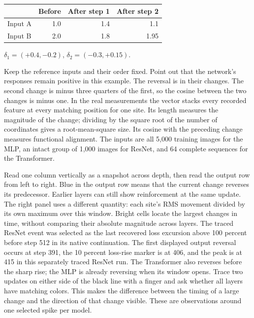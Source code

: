 {
\begin{center}\renewcommand{\arraystretch}{1.2}
\begin{tabular}{@{}lrrr@{}}\toprule
 & Before & After step 1 & After step 2\\\midrule
Input A & 1.0 & 1.4 & 1.1\\
Input B & 2.0 & 1.8 & 1.95\\\bottomrule
\end{tabular}\end{center}
\(\delta_1=(+0.4,-0.2)\), \quad \(\delta_2=(-0.3,+0.15)\).
\par{}}
{Keep the reference inputs and their order fixed. Point out that the network's responses remain positive in this example. The reversal is in their changes. The second change is minus three quarters of the first, so the cosine between the two changes is minus one. In the real measurements the vector stacks every recorded feature at every matching position for one site. Its length measures the magnitude of the change; dividing by the square root of the number of coordinates gives a root-mean-square size. Its cosine with the preceding change measures functional alignment. The inputs are all 5,000 training images for the MLP, an intact group of 1,000 images for ResNet, and 64 complete sequences for the Transformer.}

{
}
{Read one column vertically as a snapshot across depth, then read the output row from left to right. Blue in the output row means that the current change reverses its predecessor. Earlier layers can still show reinforcement at the same update. The right panel uses a different quantity: each site's RMS movement divided by its own maximum over this window. Bright cells locate the largest changes in time, without comparing their absolute magnitude across layers. The traced ResNet event was selected as the last recovered loss excursion above 100 percent before step 512 in its native continuation. The first displayed output reversal occurs at step 391, the 10 percent loss-rise marker is at 406, and the peak is at 415 in this separately traced ResNet run. The Transformer also reverses before the sharp rise; the MLP is already reversing when its window opens. Trace two updates on either side of the black line with a finger and ask whether all layers have matching colors. This makes the difference between the timing of a large change and the direction of that change visible. These are observations around one selected spike per model.}

